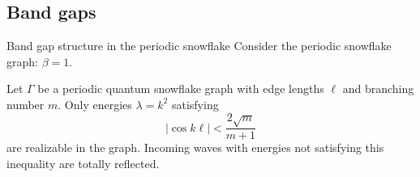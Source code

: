 \documentclass{beamer}
\newcommand{\abs}[1]{\left\lvert#1\right\rvert}
\begin{document}
  \subsection{Band gaps}

  \begin{frame}{Band gap structure in the periodic snowflake}
    Consider the periodic snowflake graph: $\beta = 1$.
    \pause
    \begin{theorem}
      Let $\Gamma$ be a periodic quantum snowflake graph with edge lengths $\ell$ and branching number $m$. Only energies $\lambda = k^2$ satisfying
      \[
        \abs{\cos k\ell} < \frac{2\sqrt{m}}{m+1}
      \]
      are realizable in the graph. Incoming waves with energies not satisfying this inequality are totally reflected.
    \end{theorem}
  \end{frame}
\end{document}
